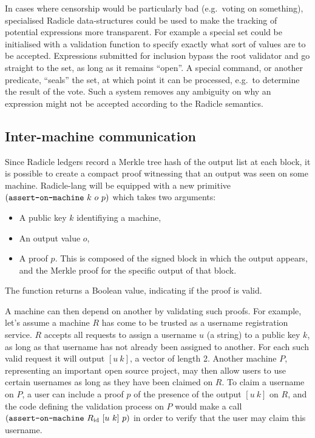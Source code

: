 \documentclass[a4paper, oneside, 10pt]{amsart}
\def\id{\mathrm{id}}
\begin{document}
In cases where censorship would be particularly bad (e.g.~voting on something),
specialised Radicle data-structures could be used to make the tracking of
potential expressions more transparent. For example a special set could be
initialised with a validation function to specify exactly what sort of values
are to be accepted. Expressions submitted for inclusion bypass the root
validator and go straight to the set, as long as it remains ``open''. A special
command, or another predicate, ``seals'' the set, at which point it can be
processed, e.g.~to determine the result of the vote. Such a system removes any
ambiguity on why an expression might not be accepted according to the Radicle
semantics.

\subsection{Inter-machine communication}\label{machine-communication}

Since Radicle ledgers record a Merkle tree hash of the output list at each
block, it is possible to create a compact proof witnessing that an output was
seen on some machine. Radicle-lang will be equipped with a new primitive
$(\text{\texttt{assert-on-machine}} \ k \ o \ p)$ which takes two arguments:
\begin{itemize}
\item
  A public key $k$ identifiying a machine,
\item
  An output value $o$,
\item
  A proof $p$. This is composed of the signed block in which the output appears,
  and the Merkle proof for the specific output of that block.
\end{itemize}
The function returns a Boolean value, indicating if the proof is valid.

A machine can then depend on another by validating such proofs. For example,
let's assume a machine $R$ has come to be trusted as a username registration
service. $R$ accepts all requests to assign a username $u$ (a string) to a
public key $k$, as long as that username has not already been assigned to
another. For each such valid request it will output $[u \ k]$, a vector of
length 2. Another machine $P$, representing an important open source project,
may then allow users to use certain usernames as long as they have been claimed
on $R$. To claim a username on $P$, a user can include a proof $p$ of the
presence of the output $[u \ k]$ on $R$, and the code defining the validation
process on $P$ would make a call $(\text{\texttt{assert-on-machine}} \ R_\id
\ [u \ k] \ p)$ in order to verify that the user may claim this username.
\end{document}
